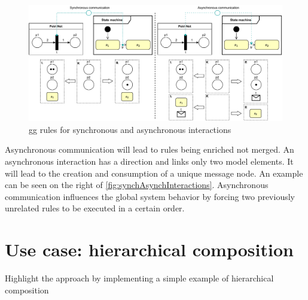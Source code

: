 \documentclass[a4paper]{easychair}
\begin{document}
\begin{figure}[h]
    \centering
    \includegraphics[width=1\textwidth]{images/synch_asynch.pdf}
    \caption{\gls{gg} rules for synchronous and asynchronous interactions}
    \label{fig:synchAsynchInteractions}
\end{figure}

Asynchronous communication will lead to rules being enriched not merged.
An asynchronous interaction has a direction and links only two model elements.
It will lead to the creation and consumption of a unique message node. 
An example can be seen on the right of \autoref{fig:synchAsynchInteractions}.
Asynchronous communication influences the global system behavior by forcing two previously unrelated rules to be executed in a certain order.




\section{Use case: hierarchical composition}
Highlight the approach by implementing a simple example of hierarchical composition
\end{document}
